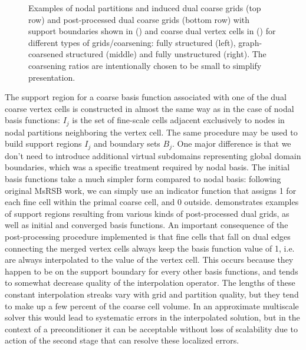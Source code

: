 \begin{figure}[htbp]
\begin{subfigure}[t]{0.3\textwidth}
  \end{subfigure}
  \caption[Dual grid for cell-centered basis functions]{\label{fig:square_cell_dual} Examples of nodal partitions and induced dual coarse grids (top row) and post-processed dual coarse grids (bottom row) with support boundaries shown in () and coarse dual vertex cells in () for different types of grids/coarsening: fully structured (left), graph-coarsened structured (middle) and fully unstructured (right).   The coarsening ratios are intentionally chosen to be small to simplify presentation.}
\end{figure}

The support region for a coarse basis function associated with one of the dual coarse vertex cells is constructed in almost the same way as in the case of nodal basis functions: $I_j$ is the set of fine-scale cells adjacent exclusively to nodes in nodal partitions neighboring the vertex cell.   The same procedure may be used to build support regions $I_j$ and boundary sets $B_j$.   One major difference is that we don't need to introduce additional virtual subdomains representing global domain boundaries, which was a specific treatment required by nodal basis.   The initial basis functions take a much simpler form compared to nodal basis: following original MsRSB work, we can simply use an indicator function that assigns 1 for each fine cell within the primal coarse cell, and 0 outside.   demonstrates examples of support regions resulting from various kinds of post-processed dual grids, as well as initial and converged basis functions.   An important consequence of the post-processing procedure implemented is that fine cells that fall on dual edges connecting the merged vertex cells always keep the basis function value of 1, i.e. are always interpolated to the value of the vertex cell.   This occurs because they happen to be on the support boundary for every other basis functions, and tends to somewhat decrease quality of the interpolation operator.   The lengths of these constant interpolation streaks vary with grid and partition quality, but they tend to make up a few percent of the coarse cell volume.   In an approximate multiscale solver this would lead to systematic errors in the interpolated solution, but in the context of a preconditioner it can be acceptable without loss of scalability due to action of the second stage that can resolve these localized errors.

